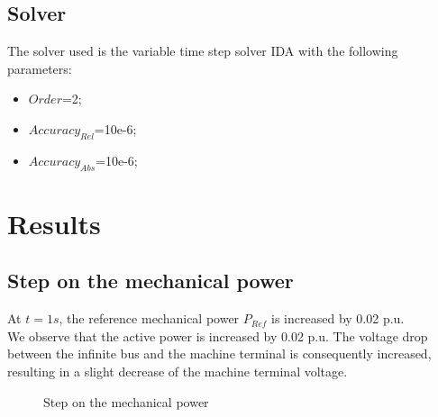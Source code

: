 \documentclass[a4paper, 12pt]{report}
\begin{document}
\subsection{Solver}
The solver used is the variable time step solver IDA with the following parameters:
\begin{itemize}
\item $Order$=2;
\item $Accuracy_{Rel}$=10e-6;
\item $Accuracy_{Abs}$=10e-6;
\end{itemize}

\newpage
\section{Results}

\subsection{Step on the mechanical power}

At $t=1s$, the reference mechanical power $P_{Ref}$ is increased by 0.02 p.u.\\

We observe that the active power is increased by 0.02 p.u. The voltage drop between the infinite bus and the machine terminal is consequently increased, resulting in a slight decrease of the machine terminal voltage.\\

\begin{figure}[H]
\caption{Step on the mechanical power}
\end{figure}
\end{document}
